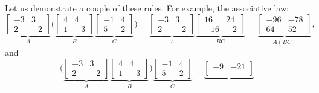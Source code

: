 \documentclass{ximera}
\begin{document}
\begin{example}
    Let us demonstrate a couple of these rules.  For example, the associative law:
    \begin{equation*}
        \underbrace{
        \begin{bmatrix}
            -3 & 3 \\ 
            2 & -2
        \end{bmatrix}
        }_A \biggl( \underbrace{
        \begin{bmatrix}
            4 & 4 \\ 
            1 & -3
        \end{bmatrix}
        }_B \underbrace{
        \begin{bmatrix}
            -1 & 4 \\ 
            5 & 2
        \end{bmatrix}
        }_C \biggr) = \underbrace{
        \begin{bmatrix}
            -3 & 3 \\ 
            2 & -2
        \end{bmatrix}
        }_A \underbrace{
        \begin{bmatrix}
            16 & 24 \\ 
            -16 & -2
        \end{bmatrix}
        }_{BC} = \underbrace{
        \begin{bmatrix}
            -96 & -78 \\ 
            64 & 52
        \end{bmatrix}
        }_{A(BC)} ,
    \end{equation*}
    and
    \begin{equation*}
        \biggl( \underbrace{
        \begin{bmatrix}
            -3 & 3 \\ 
            2 & -2
        \end{bmatrix}
        }_A \underbrace{
        \begin{bmatrix}
            4 & 4 \\ 
            1 & -3
        \end{bmatrix}
        }_B \biggr) \underbrace{
        \begin{bmatrix}
            -1 & 4 \\ 
            5 & 2
        \end{bmatrix}
        }_C = \underbrace{
        \begin{bmatrix}
            -9 & -21 \\ 

\end{bmatrix}}
\end{equation*}
\end{example}
\end{document}
